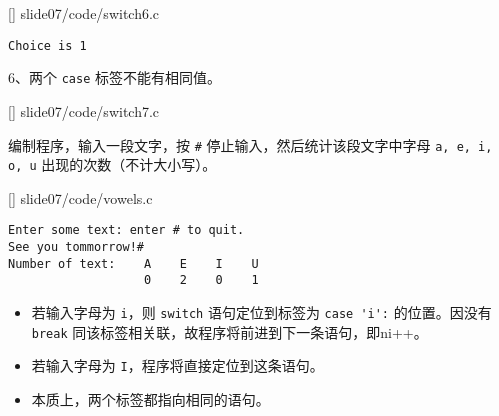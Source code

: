 \begin{frame}\ft{\secname}

[]
{slide07/code/switch6.c}
\begin{lstlisting}[backgroundcolor=\color{blue!20}]
Choice is 1
\end{lstlisting}
\end{frame}

\begin{frame}\ft{\secname}
6、两个 \lstinline|case| 标签不能有相同值。
\end{frame}

\begin{frame}\ft{\secname}

[]
{slide07/code/switch7.c}
\end{frame}



\begin{frame}[fragile]\ft{\secname}
  \begin{free}[例]{}
    编制程序，输入一段文字，按 \lstinline|#| 停止输入，然后统计该段文字中字母 \lstinline|a, e, i, o, u| 出现的次数（不计大小写）。
  \end{free}
\end{frame}



\begin{frame}\ft{\secname}

[]
{slide07/code/vowels.c}
\end{frame}

\begin{frame}[fragile]\ft{\secname}
\begin{lstlisting}[backgroundcolor=\color{red!10}]
Enter some text: enter # to quit.
See you tommorrow!#
Number of text:    A    E    I    U
                   0    2    0    1
\end{lstlisting}   
\end{frame}

\begin{frame}[fragile]\ft{\secname}
\begin{itemize}
\item
若输入字母为 \lstinline|i|，则 \lstinline|switch| 语句定位到标签为 \lstinline|case 'i':| 的位置。因没有 \lstinline|break| 同该标签相关联，故程序将前进到下一条语句，即ni++。\\[0.1in]
\item 
若输入字母为 \lstinline|I|，程序将直接定位到这条语句。\\[0.1in]
\item 
本质上，两个标签都指向相同的语句。
\end{itemize} 
\end{frame}

